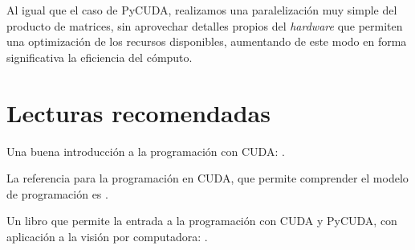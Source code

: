 Al igual que el caso de PyCUDA, realizamos una paralelización muy simple del producto de matrices, sin aprovechar detalles propios del \textit{hardware} que permiten una optimización de los recursos disponibles, aumentando de este modo en forma significativa la eficiencia del cómputo.

\section{Lecturas recomendadas}
Una buena introducción a la programación con CUDA: .

La referencia para la programación en CUDA, que permite comprender el modelo de programación es .

Un libro que permite la entrada a la programación con CUDA y PyCUDA, con aplicación a la visión por computadora: .

